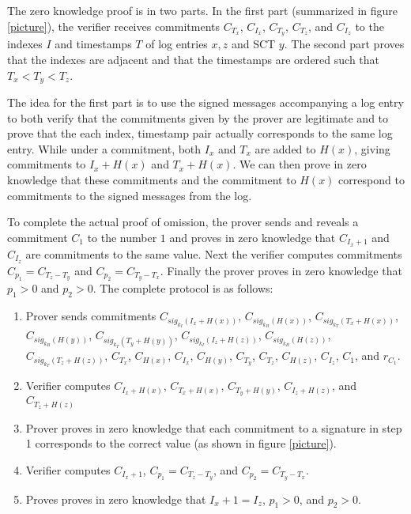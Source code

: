 \documentclass[letterpaper,twocolumn,10pt]{article}
\begin{document}
The zero knowledge proof is in two parts. In the first part (summarized in figure \ref{picture}), the verifier receives commitments $C_{T_x}$, $C_{I_x}$, $C_{T_y}$, $C_{T_z}$, and $C_{I_z}$ to the indexes $I$ and timestamps $T$ of log entries $x, z$ and SCT $y$. The second part proves that the indexes are adjacent and that the timestamps are ordered such that $T_x<T_y<T_z$.

The idea for the first part is to use the signed messages accompanying a log entry to both verify that the commitments given by the prover are legitimate and to prove that the each index, timestamp pair actually corresponds to the same log entry. While under a commitment, both $I_x$ and $T_x$ are added to $H(x)$, giving commitments to $I_x+H(x)$ and $T_x+H(x)$. We can then prove in zero knowledge that these commitments and the commitment to $H(x)$ correspond to commitments to the signed messages from the log. 

To complete the actual proof of omission, the prover sends and reveals a commitment $C_1$ to the number $1$ and proves in zero knowledge that $C_{I_x+1}$ and $C_{I_z}$ are commitments to the same value. Next the verifier computes commitments $C_{p_1}=C_{T_z-T_y}$ and $C_{p_2}=C_{T_y-T_x}$. Finally the prover proves in zero knowledge that $p_1>0$ and $p_2>0$. The complete protocol is as follows:

\begin{enumerate}
\item Prover sends commitments $C_{sig_{k_I}(I_x+H(x))}$, $C_{sig_{k_H}(H(x))}$, $C_{sig_{k_T}(T_x+H(x))}$,  $C_{sig_{k_H}(H(y))}$, $C_{sig_{k_T}(T_y+H(y))}$, $C_{sig_{k_I}(I_z+H(z))}$, $C_{sig_{k_H}(H(z))}$, $C_{sig_{k_T}(T_z+H(z))}$, $C_{T_x}$, $C_{H(x)}$, $C_{I_x}$, $C_{H(y)}$, $C_{T_y}$, $C_{T_z}$, $C_{H(z)}$, $C_{I_z}$, $C_1$, and $r_{C_1}$.

\item Verifier computes $C_{I_x+H(x)}$, $C_{T_x+H(x)}$, $C_{T_y+H(y)}$, $C_{I_z+H(z)}$, and $C_{T_z+H(z)}$

\item Prover proves in zero knowledge that each commitment to a signature in step 1 corresponds to the correct value (as shown in figure \ref{picture}).

\item Verifier computes $C_{I_x+1}$, $C_{p_1}=C_{T_z-T_y}$, and $C_{p_2}=C_{T_y-T_x}$.

\item Proves proves in zero knowledge that $I_x+1=I_z$, $p_1>0$, and $p_2>0$.
\end{enumerate}
\end{document}
